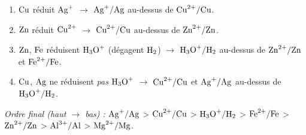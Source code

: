 \documentclass[11pt]{article}
\begin{document}
\begin{exemplebox}
\begin{enumerate}
  \item $\ce{Cu}$ réduit $\ce{Ag+}$ $\to$ $\ce{Ag+}/\ce{Ag}$ au-dessus de $\ce{Cu^2+}/\ce{Cu}$.
  \item $\ce{Zn}$ réduit $\ce{Cu^2+}$ $\to$ $\ce{Cu^2+}/\ce{Cu}$ au-dessus de $\ce{Zn^2+}/\ce{Zn}$.
  \item $\ce{Zn}$, $\ce{Fe}$ réduisent $\ce{H3O+}$ (dégagent $\ce{H2}$) $\to$ $\ce{H3O+}/\ce{H2}$ au-dessus de $\ce{Zn^2+}/\ce{Zn}$ et $\ce{Fe^2+}/\ce{Fe}$.
  \item $\ce{Cu}$, $\ce{Ag}$ ne réduisent \emph{pas} $\ce{H3O+}$ $\to$ $\ce{Cu^2+}/\ce{Cu}$ et $\ce{Ag+}/\ce{Ag}$ au-dessus de $\ce{H3O+}/\ce{H2}$.
\end{enumerate}
\emph{Ordre final (haut $\to$ bas) :} $\ce{Ag+}/\ce{Ag}$ > $\ce{Cu^2+}/\ce{Cu}$ > $\ce{H3O+}/\ce{H2}$ > $\ce{Fe^2+}/\ce{Fe}$ > $\ce{Zn^2+}/\ce{Zn}$ > $\ce{Al^3+}/\ce{Al}$ > $\ce{Mg^2+}/\ce{Mg}$.
\end{exemplebox}
\end{document}
